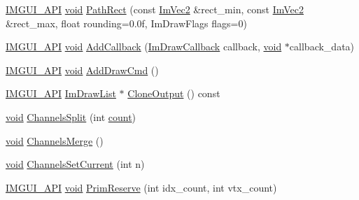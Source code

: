 \begin{DoxyCompactItemize}
\item 
\hyperlink{imgui_8h_a43829975e84e45d1149597467a14bbf5}{I\+M\+G\+U\+I\+\_\+\+A\+PI} \hyperlink{imgui__impl__opengl3__loader_8h_ac668e7cffd9e2e9cfee428b9b2f34fa7}{void} \hyperlink{structImDrawList_a2251eb264ed8b17a253c409787375053}{Path\+Rect} (const \hyperlink{structImVec2}{Im\+Vec2} \&rect\+\_\+min, const \hyperlink{structImVec2}{Im\+Vec2} \&rect\+\_\+max, float rounding=0.\+0f, Im\+Draw\+Flags flags=0)
\item 
\hyperlink{imgui_8h_a43829975e84e45d1149597467a14bbf5}{I\+M\+G\+U\+I\+\_\+\+A\+PI} \hyperlink{imgui__impl__opengl3__loader_8h_ac668e7cffd9e2e9cfee428b9b2f34fa7}{void} \hyperlink{structImDrawList_a14073d60ef9db9dc663dc7717a4893a5}{Add\+Callback} (\hyperlink{imgui_8h_a232a477233f9e3ab7640720bf94674de}{Im\+Draw\+Callback} callback, \hyperlink{imgui__impl__opengl3__loader_8h_ac668e7cffd9e2e9cfee428b9b2f34fa7}{void} $\ast$callback\+\_\+data)
\item 
\hyperlink{imgui_8h_a43829975e84e45d1149597467a14bbf5}{I\+M\+G\+U\+I\+\_\+\+A\+PI} \hyperlink{imgui__impl__opengl3__loader_8h_ac668e7cffd9e2e9cfee428b9b2f34fa7}{void} \hyperlink{structImDrawList_a846714bb0321c6f1f908767abc8559e6}{Add\+Draw\+Cmd} ()
\item 
\hyperlink{imgui_8h_a43829975e84e45d1149597467a14bbf5}{I\+M\+G\+U\+I\+\_\+\+A\+PI} \hyperlink{structImDrawList}{Im\+Draw\+List} $\ast$ \hyperlink{structImDrawList_a24c853c3976c77e7b361fab39adde686}{Clone\+Output} () const
\item 
\hyperlink{imgui__impl__opengl3__loader_8h_ac668e7cffd9e2e9cfee428b9b2f34fa7}{void} \hyperlink{structImDrawList_acd7bcb6c4c5043876cfc169a98abc24a}{Channels\+Split} (int \hyperlink{imgui__impl__opengl3__loader_8h_a619bc20e8198de3bd3f3d7fc34de66b2}{count})
\item 
\hyperlink{imgui__impl__opengl3__loader_8h_ac668e7cffd9e2e9cfee428b9b2f34fa7}{void} \hyperlink{structImDrawList_a2ed82c3f663cda520c90c55b94196274}{Channels\+Merge} ()
\item 
\hyperlink{imgui__impl__opengl3__loader_8h_ac668e7cffd9e2e9cfee428b9b2f34fa7}{void} \hyperlink{structImDrawList_aba9e93d0bf1c3884beb726e96360d2e2}{Channels\+Set\+Current} (int n)
\item 
\hyperlink{imgui_8h_a43829975e84e45d1149597467a14bbf5}{I\+M\+G\+U\+I\+\_\+\+A\+PI} \hyperlink{imgui__impl__opengl3__loader_8h_ac668e7cffd9e2e9cfee428b9b2f34fa7}{void} \hyperlink{structImDrawList_a879aa38dbfb0344e3e023d65c002c7d7}{Prim\+Reserve} (int idx\+\_\+count, int vtx\+\_\+count)
\item 

\end{DoxyCompactItemize}
